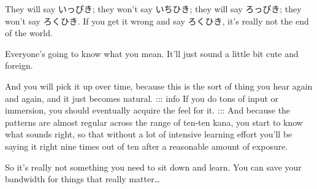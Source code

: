 They will say いっぴき; they won't say いちひき; they will say ろっぴき; they won't say ろくひき. If you get it wrong and say ろくひき, it's really not the end of the world.

Everyone's going to know what you mean. It'll just sound a little bit cute and foreign.

And you will pick it up over time, because this is the sort of thing you hear again and again, and it just becomes natural. ::: info If you do tons of input or immersion, you should eventually acquire the feel for it. ::: And because the patterns are almost regular across the range of ten-ten kana, you start to know what sounds right, so that without a lot of intensive learning effort you'll be saying it right nine times out of ten after a reasonable amount of exposure.

So it's really not something you need to sit down and learn. You can save your bandwidth for things that really matter\ldots{}

\stopsectionlevel

\stopsectionlevel

\stopsectionlevel

\stopsectionlevel
